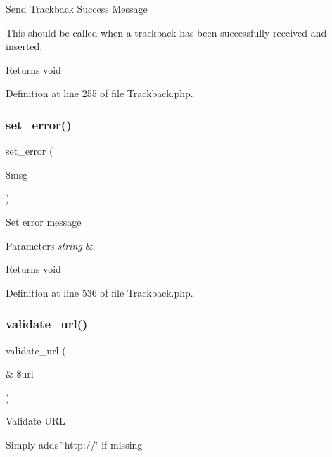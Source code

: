 Send Trackback Success Message

This should be called when a trackback has been successfully received and inserted.

\begin{DoxyReturn}{Returns}
void 
\end{DoxyReturn}


Definition at line 255 of file Trackback.\+php.

\mbox{\label{class_c_i___trackback_a892f1ba7cba3731a3fc68f1f64e92610}} 
\subsubsection{\texorpdfstring{set\_error()}{set\_error()}}
{\footnotesize\ttfamily set\+\_\+error (\begin{DoxyParamCaption}\item[{}]{\$msg }\end{DoxyParamCaption})}

Set error message


\begin{DoxyParams}{Parameters}
{\em string} & \\
\hline
\end{DoxyParams}
\begin{DoxyReturn}{Returns}
void 
\end{DoxyReturn}


Definition at line 536 of file Trackback.\+php.

\mbox{\label{class_c_i___trackback_a5caa264fab6d2b2344e6bd5b298b08f2}} 
\subsubsection{\texorpdfstring{validate\_url()}{validate\_url()}}
{\footnotesize\ttfamily validate\+\_\+url (\begin{DoxyParamCaption}\item[{\&}]{\$url }\end{DoxyParamCaption})}

Validate U\+RL

Simply adds \char`\"{}http\+://\char`\"{} if missing



